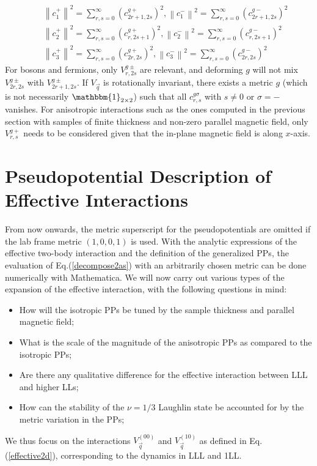 \documentclass[twocolumn,showpacs,amsmath,amstex,amssymb,mathfonts,prb]{revtex4-1}
\newcommand{\norm}[1]{\left\lVert#1\right\rVert}
\begin{document}
\begin{eqnarray}\label{identity}
&&\norm{c_1^+}^2=\sum_{r,s=0}^\infty \left(c_{2r+1,2s}^{g+}\right)^2,\norm{c_1^-}^2=\sum_{r,s=0}^\infty \left(c_{2r+1,2s}^{g-}\right)^2\nonumber\\
&&\norm{c_2^+}^2=\sum_{r,s=0}^\infty \left(c_{r,2s+1}^{g+}\right)^2,\norm{c_2^-}^2=\sum_{r,s=0}^\infty \left(c_{r,2s+1}^{g-}\right)^2\nonumber\\
&&\norm{c_3^+}^2=\sum_{r,s=0}^\infty \left(c_{2r,2s}^{g+}\right)^2,\norm{c_3^-}^2=\sum_{r,s=0}^\infty \left(c_{2r,2s}^{g-}\right)^2
\end{eqnarray}
For bosons and fermions, only $V_{r,2s}^{g\pm}$ are relevant, and deforming $g$ will not mix $V_{2r,2s}^{g\pm}$ with $V_{2r+1,2s}^{g\pm}$. If $V_{\vec q}$ is rotationally invariant, there exists a metric $g$ (which is not necessarily $\mathbbm{1}_{2\times 2}$) such that all $c_{r,s}^{g\sigma}$ with $s\neq 0$ or $\sigma=-$ vanishes. For anisotropic interactions such as the ones computed in the previous section with samples of finite thickness and non-zero parallel magnetic field, only $V^{g+}_{r,s}$ needs to be considered given that the in-plane magnetic field is along $x$-axis.  

\section{Pseudopotential Description of Effective Interactions}\label{expansion}

From now onwards, the metric superscript for the pseudopotentials are omitted if the lab frame metric $\left(1,0,0,1\right)$ is used. With the analytic expressions of the effective two-body interaction and the definition of the generalized PPs, the evaluation of Eq.(\ref{decompose2as}) with an arbitrarily chosen metric can be done numerically with Mathematica. We will now carry out various types of the expansion of the effective interaction, with the following questions in mind:
\begin{itemize}
\item How will the isotropic PPs be tuned by the sample thickness and parallel magnetic field;
\item What is the scale of the magnitude of the anisotropic PPs as compared to the isotropic PPs;
\item Are there any qualitative difference for the effective interaction between LLL and higher LLs; 
\item How can the stability of the $\nu=1/3$ Laughlin state be accounted for by the metric variation in the PPs;
\end{itemize}
We thus focus on the interactions $V_{\vec q}^{\left(00\right)}$ and $V_{\vec q}^{\left(10\right)}$ as defined in Eq.(\ref{effective2d}), corresponding to the dynamics in LLL and 1LL. 
\end{document}

